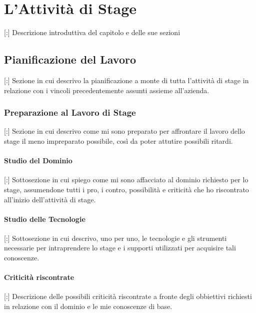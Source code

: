 \chapter{L'Attività di Stage}
\thispagestyle{fancy} 

[:] Descrizione introduttiva del capitolo e delle sue sezioni

\section{Pianificazione del Lavoro}

[:] Sezione in cui descrivo la pianificazione a monte di tutta l'attività di stage in relazione con i vincoli precedentemente assunti assieme all'azienda.



\subsection{Preparazione al Lavoro di Stage}

[:] Sezione in cui descrivo come mi sono preparato per affrontare il lavoro dello stage il meno impreparato possibile, così da poter attutire possibili ritardi.

\subsubsection{Studio del Dominio}

[:] Sottosezione in cui spiego come mi sono affacciato al dominio richiesto per lo stage, assumendone tutti i pro, i contro, possibilità e criticità che ho riscontrato all'inizio dell'attività di stage.

\subsubsection{Studio delle Tecnologie}

[:] Sottosezione in cui descrivo, uno per uno, le tecnologie e gli strumenti necessarie per intraprendere lo stage e i supporti utilizzati per acquisire tali conoscenze.


\subsubsection{Criticità riscontrate}

[:] Descrizione delle possibili criticità riscontrate a fronte degli obbiettivi richiesti in relazione con il dominio e le mie conoscenze di base.




